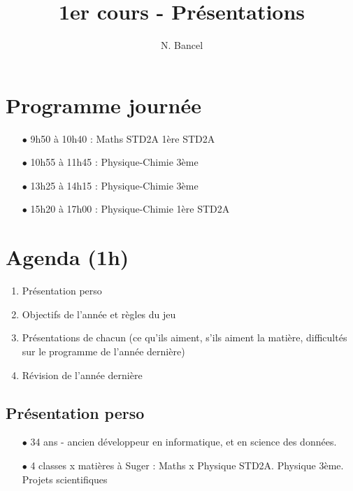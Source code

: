 \documentclass[a4paper,12pt]{article}
\begin{document}
\title{1er cours - Présentations}
\author{N. Bancel}

\sloppy  %
\maketitle

\section{Programme journée}

\begin{itemize}
\item[$\bullet$] 9h50 à 10h40 : Maths STD2A 1ère STD2A
\item[$\bullet$] 10h55 à 11h45 : Physique-Chimie 3ème
\item[$\bullet$] 13h25 à 14h15 : Physique-Chimie 3ème
\item[$\bullet$] 15h20 à 17h00 : Physique-Chimie 1ère STD2A
\end{itemize}

\section{Agenda (1h)}


\begin{enumerate}
  \item Présentation perso
  \item Objectifs de l'année et règles du jeu
  \item Présentations de chacun (ce qu'ils aiment, s'ils aiment la matière, difficultés sur le programme de l'année dernière)
  \item Révision de l'année dernière
\end{enumerate}

\subsection{Présentation perso}
\begin{itemize}
  \item[$\bullet$] 34 ans - ancien développeur en informatique, et en science des données.
  \item[$\bullet$] 4 classes x matières à Suger : Maths x Physique STD2A. Physique 3ème. Projets scientifiques
\end{itemize}
\end{document}
